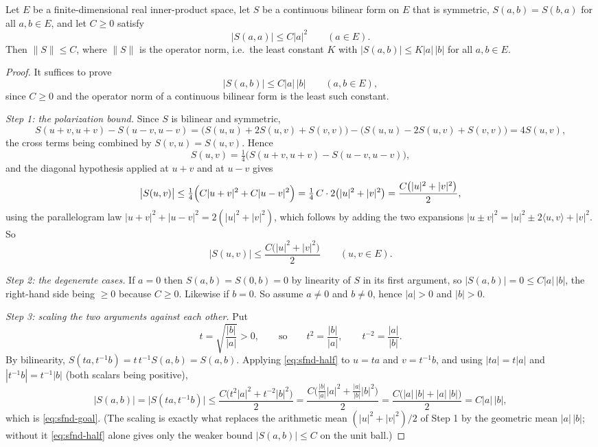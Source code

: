 \begin{lemma}
Let $E$ be a finite-dimensional real inner-product space, let $S$ be a continuous
bilinear form on $E$ that is symmetric, $S(a,b)=S(b,a)$ for all $a,b\in E$, and
let $C\ge0$ satisfy
\[
  \bigl|S(a,a)\bigr|\le C|a|^2\qquad(a\in E).
\]
Then $\|S\|\le C$, where $\|S\|$ is the operator norm, i.e.\ the least constant
$K$ with $|S(a,b)|\le K|a|\,|b|$ for all $a,b\in E$.
\end{lemma}
\begin{proof}
It suffices to prove
\begin{equation}\label{eq:sfnd-goal}
  \bigl|S(a,b)\bigr|\le C|a|\,|b|\qquad(a,b\in E),
\end{equation}
since $C\ge0$ and the operator norm of a continuous bilinear form is the least
such constant.

\emph{Step 1: the polarization bound.}
Since $S$ is bilinear and symmetric,
\[
  S(u+v,u+v)-S(u-v,u-v)
   =\bigl(S(u,u)+2S(u,v)+S(v,v)\bigr)
     -\bigl(S(u,u)-2S(u,v)+S(v,v)\bigr)=4S(u,v),
\]
the cross terms being combined by $S(v,u)=S(u,v)$. Hence
\[
  S(u,v)=\tfrac14\bigl(S(u+v,u+v)-S(u-v,u-v)\bigr),
\]
and the diagonal hypothesis applied at $u+v$ and at $u-v$ gives
\[
  \bigl|S(u,v)\bigr|
   \le\tfrac14\Bigl(C|u+v|^2+C|u-v|^2\Bigr)
   =\tfrac14\,C\cdot2\bigl(|u|^2+|v|^2\bigr)
   =\frac{C\bigl(|u|^2+|v|^2\bigr)}{2},
\]
using the parallelogram law $|u+v|^2+|u-v|^2=2(|u|^2+|v|^2)$, which follows by
adding the two expansions $|u\pm v|^2=|u|^2\pm2\langle u,v\rangle+|v|^2$. So
\begin{equation}\label{eq:sfnd-half}
  \bigl|S(u,v)\bigr|\le\frac{C\bigl(|u|^2+|v|^2\bigr)}{2}\qquad(u,v\in E).
\end{equation}

\emph{Step 2: the degenerate cases.}
If $a=0$ then $S(a,b)=S(0,b)=0$ by linearity of $S$ in its first argument, so
$|S(a,b)|=0\le C|a|\,|b|$, the right-hand side being $\ge0$ because $C\ge0$.
Likewise if $b=0$. So assume $a\ne0$ and $b\ne0$, hence $|a|>0$ and $|b|>0$.

\emph{Step 3: scaling the two arguments against each other.}
Put
\[
  t=\sqrt{\frac{|b|}{|a|}}>0,\qquad\text{so}\qquad
  t^2=\frac{|b|}{|a|},\qquad t^{-2}=\frac{|a|}{|b|} .
\]
By bilinearity, $S(ta,t^{-1}b)=t\,t^{-1}S(a,b)=S(a,b)$. Applying
\eqref{eq:sfnd-half} to $u=ta$ and $v=t^{-1}b$, and using
$|ta|=t|a|$ and $|t^{-1}b|=t^{-1}|b|$ (both scalars being positive),
\[
  \bigl|S(a,b)\bigr|
   =\bigl|S(ta,t^{-1}b)\bigr|
   \le\frac{C\bigl(t^2|a|^2+t^{-2}|b|^2\bigr)}{2}
   =\frac{C\bigl(\tfrac{|b|}{|a|}|a|^2+\tfrac{|a|}{|b|}|b|^2\bigr)}{2}
   =\frac{C\bigl(|a|\,|b|+|a|\,|b|\bigr)}{2}
   =C|a|\,|b| ,
\]
which is \eqref{eq:sfnd-goal}. (The scaling is exactly what replaces the
arithmetic mean $(|u|^2+|v|^2)/2$ of Step 1 by the geometric mean
$|a|\,|b|$; without it \eqref{eq:sfnd-half} alone gives only the weaker bound
$|S(a,b)|\le C$ on the unit ball.)
\end{proof}
